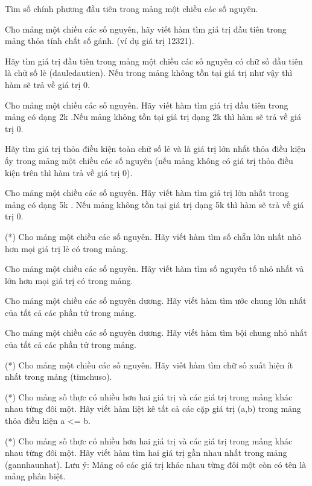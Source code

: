 \begin{problem}
    Tìm số chính phương đầu tiên trong mảng một chiều các số nguyên.
\end{problem}
\begin{problem}
    Cho mảng một chiều các số nguyên, hãy viết hàm tìm giá trị đầu tiên trong mảng thỏa tính chất số gánh. (ví dụ giá trị 12321).
\end{problem}
\begin{problem}
    Hãy tìm giá trị đầu tiên trong mảng một chiều các số nguyên có chữ số đầu tiên là chữ số lẻ (dauledautien). Nếu trong mảng không tồn tại giá trị như vậy thì hàm sẽ trả về giá trị 0.
\end{problem}
\begin{problem}
    Cho mảng một chiều các số nguyên. Hãy viết hàm tìm giá trị đầu tiên trong mảng có dạng 2k .Nếu mảng không tồn tại giá trị dạng 2k thì hàm sẽ trả về giá trị 0.
\end{problem}
\begin{problem}
    Hãy tìm giá trị thỏa điều kiện toàn chữ số lẻ và là giá trị lớn nhất thỏa điều kiện ấy trong mảng một chiều các số nguyên (nếu mảng không có giá trị thỏa điều kiện trên thì hàm trả về giá trị 0).
\end{problem}
\begin{problem}
    Cho mảng một chiều các số nguyên. Hãy viết hàm tìm giá trị lớn nhất trong mảng có dạng 5k . Nếu mảng không tồn tại giá trị dạng 5k thì hàm sẽ trả về giá trị 0.
\end{problem}
\begin{problem}
    (*) Cho mảng một chiều các số nguyên. Hãy viết hàm tìm số chẵn lớn nhất nhỏ hơn mọi giá trị lẻ có trong mảng.
\end{problem}
\begin{problem}
    Cho mảng một chiều các số nguyên. Hãy viết hàm tìm số nguyên tố nhỏ nhất và lớn hơn mọi giá trị có trong mảng.
\end{problem}
\begin{problem}
    Cho mảng một chiều các số nguyên dương. Hãy viết hàm tìm ước chung lớn nhất của tất cả các phần tử trong mảng.
\end{problem}
\begin{problem}
    Cho mảng một chiều các số nguyên dương. Hãy viết hàm tìm bội chung nhỏ nhất của tất cả các phần tử trong mảng.
\end{problem}
\begin{problem}
    (*) Cho mảng một chiều các số nguyên. Hãy viết hàm tìm chữ số xuất hiện ít nhất trong mảng (timchuso).
\end{problem}
\begin{problem}
    (*) Cho mảng số thực có nhiều hơn hai giá trị và các giá trị trong mảng khác nhau từng đôi một. Hãy viết hàm liệt kê tất cả các cặp giá trị (a,b) trong mảng thỏa điều kiện a <= b.
\end{problem}
\begin{problem}
    (*) Cho mảng số thực có nhiều hơn hai giá trị và các giá trị trong mảng khác nhau từng đôi một. Hãy viết hàm tìm hai giá trị gần nhau nhất trong mảng (gannhaunhat). Lưu ý: Mảng có các giá trị khác nhau từng đôi một còn có tên là mảng phân biệt.
\end{problem}

